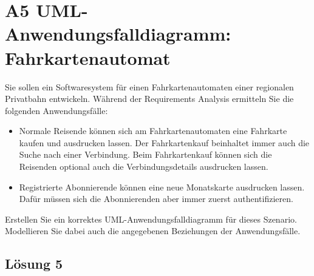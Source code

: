\documentclass[main.tex]{subfiles}
\begin{document}
\section{A5 UML-Anwendungsfalldiagramm: Fahrkartenautomat}
Sie sollen ein Softwaresystem für einen Fahrkartenautomaten einer regionalen Privatbahn entwickeln. Während der Requirements Analysis ermitteln Sie die folgenden Anwendungsfälle:

\begin{itemize}
    \item Normale Reisende können sich am Fahrkartenautomaten eine Fahrkarte kaufen und ausdrucken lassen. Der Fahrkartenkauf beinhaltet immer auch die Suche nach einer Verbindung. Beim Fahrkartenkauf können sich die Reisenden optional auch die Verbindungsdetails ausdrucken lassen.
    \item Registrierte Abonnierende können eine neue Monatskarte ausdrucken lassen. Dafür müssen sich die Abonnierenden aber immer zuerst authentifizieren.
\end{itemize}
Erstellen Sie ein korrektes UML-Anwendungsfalldiagramm für dieses Szenario. Modellieren Sie dabei auch die angegebenen Beziehungen der Anwendungsfälle.  

\subsection{Lösung 5}
\end{document}
